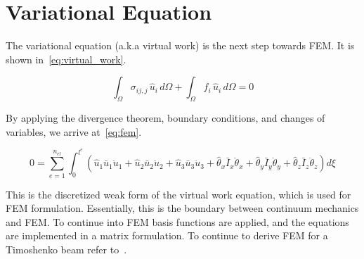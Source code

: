 \section{Variational Equation}
The variational equation (a.k.a virtual work) is the next step towards FEM.
It is shown in~\cref{eq:virtual_work}.

\begin{equation}
\int_{\Omega} \sigma_{ij,j} \, \hat{u}_i \, d\Omega 
+ \int_{\Omega} f_i \, \hat{u}_i \, d\Omega 
= 0
\label{eq:virtual_work}
\end{equation}

By applying the divergence theorem, boundary conditions, and changes of variables, we arrive at~\cref{eq:fem}.

\begin{equation}
0 = \sum_{e=1}^{n_{el}} \int_{0}^{l^e} 
\left(
\hat{u}_1 \bar{u}_1 \ddot{u}_1 + 
\hat{u}_2 \bar{u}_2 \ddot{u}_2 + 
\hat{u}_3 \bar{u}_3 \ddot{u}_3 + 
\hat{\theta}_x \bar{I}_x \ddot{\theta}_x + 
\hat{\theta}_y \bar{I}_y \ddot{\theta}_y + 
\hat{\theta}_z \bar{I}_z \ddot{\theta}_z
\right) d\xi
\label{eq:fem}
\end{equation}

This is the discretized weak form of the virtual work equation, which is used for FEM formulation.
Essentially, this is the boundary between continuum mechanics and FEM.
To continue into FEM basis functions are applied, and the equations are implemented in a matrix formulation.
To continue to derive FEM for a Timoshenko beam refer to~\cite{hughes-fem}.